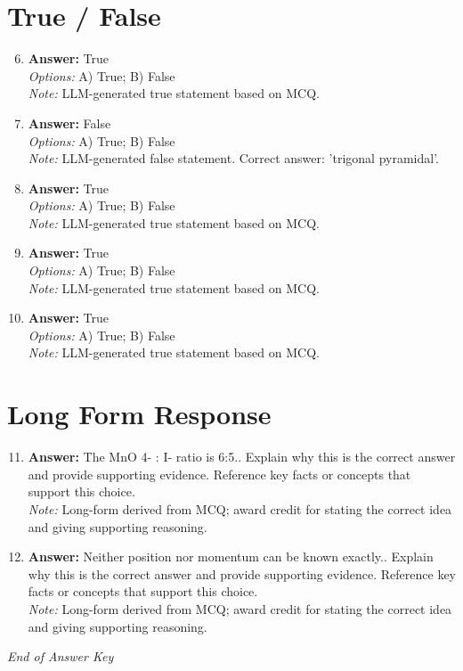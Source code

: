\documentclass[12pt]{article}
\begin{document}
\section*{True / False}
\begin{enumerate}[label=\arabic*.]
\setcounter{enumi}{5}
\item \textbf{Answer:} True
\\ \textit{Options:} A) True; B) False
\\ \textit{Note:} LLM-generated true statement based on MCQ.
\item \textbf{Answer:} False
\\ \textit{Options:} A) True; B) False
\\ \textit{Note:} LLM-generated false statement. Correct answer: 'trigonal pyramidal'.
\item \textbf{Answer:} True
\\ \textit{Options:} A) True; B) False
\\ \textit{Note:} LLM-generated true statement based on MCQ.
\item \textbf{Answer:} True
\\ \textit{Options:} A) True; B) False
\\ \textit{Note:} LLM-generated true statement based on MCQ.
\item \textbf{Answer:} True
\\ \textit{Options:} A) True; B) False
\\ \textit{Note:} LLM-generated true statement based on MCQ.
\end{enumerate}

\section*{Long Form Response}
\begin{enumerate}[label=\arabic*.]
\setcounter{enumi}{10}
\item \textbf{Answer:} The MnO 4- : I- ratio is 6:5.. Explain why this is the correct answer and provide supporting evidence. Reference key facts or concepts that support this choice.
\\ \textit{Note:} Long-form derived from MCQ; award credit for stating the correct idea and giving supporting reasoning.
\item \textbf{Answer:} Neither position nor momentum can be known exactly.. Explain why this is the correct answer and provide supporting evidence. Reference key facts or concepts that support this choice.
\\ \textit{Note:} Long-form derived from MCQ; award credit for stating the correct idea and giving supporting reasoning.
\end{enumerate}

\vfill
\noindent\textit{End of Answer Key}
\end{document}
